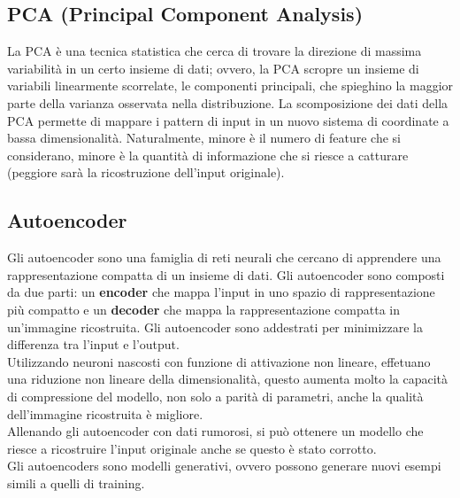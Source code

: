 \subsection{PCA (Principal Component Analysis)}

La PCA è una tecnica statistica che cerca di trovare la direzione di massima
variabilità in un certo insieme di dati; ovvero, la PCA scropre un insieme di
variabili linearmente scorrelate, le componenti principali, che spieghino la
maggior parte della varianza osservata nella distribuzione.
La scomposizione dei dati della PCA permette di mappare i pattern di input in un
nuovo sistema di coordinate a bassa dimensionalità. Naturalmente, minore è il
numero di feature che si considerano, minore è la quantità di informazione che
si riesce a catturare (peggiore sarà la ricostruzione dell'input originale).

\subsection{Autoencoder}

Gli autoencoder sono una famiglia di reti neurali che cercano di apprendere una
rappresentazione compatta di un insieme di dati. Gli autoencoder sono composti
da due parti: un \textbf{encoder} che mappa l'input in uno spazio di
rappresentazione più compatto e un \textbf{decoder} che mappa la rappresentazione
compatta in un'immagine ricostruita. Gli autoencoder sono addestrati per
minimizzare la differenza tra l'input e l'output.\\
Utilizzando neuroni nascosti con funzione di attivazione non lineare, effetuano
una riduzione non lineare della dimensionalità, questo aumenta molto la capacità
di compressione del modello, non solo a parità di parametri, anche la qualità
dell'immagine ricostruita è migliore.\\
Allenando gli autoencoder con dati rumorosi, si può ottenere un modello che
riesce a ricostruire l'input originale anche se questo è stato corrotto.\\
Gli autoencoders sono modelli generativi, ovvero possono generare nuovi esempi
simili a quelli di training.
